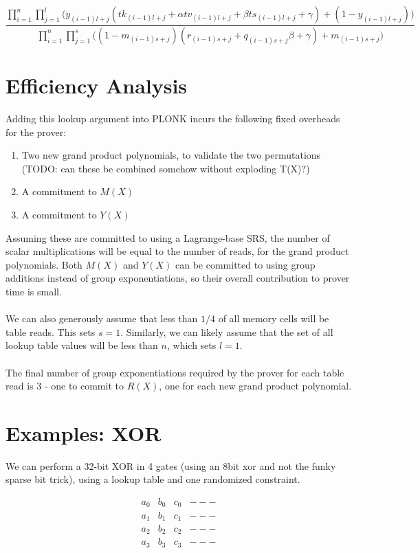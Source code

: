 \documentclass[11pt]{article} %
\begin{document}
$$
\frac{
\prod_{i=1}^n \prod_{j=1}^l \bigg( y_{(i-1)l + j}(tk_{(i-1)l + j} + \alpha tv_{(i-1)l + j} + \beta ts_{(i-1)l + j} + \gamma) + (1 - y_{(i-1)l + j}) \bigg)
}
{
{\prod_{i=1}^n \prod_{j=1}^s\bigg( (1 - m_{(i-1)s + j})(r_{(i-1)s + j} + q_{(i-1)s + j}\beta + \gamma) + m_{(i-1)s + j} \bigg)}
}
$$

\section{Efficiency Analysis}

Adding this lookup argument into PLONK incurs the following fixed overheads for the prover:

\begin{enumerate}
	\item Two new grand product polynomials, to validate the two permutations (TODO: can these be combined somehow without exploding T(X)?)
	\item A commitment to $M(X)$
	\item A commitment to $Y(X)$
\end{enumerate}

Assuming these are committed to using a Lagrange-base SRS, the number of scalar multiplications will be equal to the number of reads, for the grand product polynomials. Both $M(X)$ and $Y(X)$ can be committed to using group additions instead of group exponentiations, so their overall contribution to prover time is small.
\\
\\
We can also generously assume that less than $1/4$ of all memory cells will be table reads. This sets $s = 1$. Similarly, we can likely assume that the set of all lookup table values will be less than $n$, which sets $l = 1$.
\\
\\
The final number of group exponentiations required by the prover for each table read is $3$ - one to commit to $R(X)$, one for each new grand product polynomial.

\section{Examples: XOR}

We can perform a 32-bit XOR in 4 gates (using an 8bit xor and not the funky sparse bit trick), using a lookup table and one randomized constraint.

$$
\begin{array}{cccc}
a_0 & b_0 & c_0 & --- \\
a_1 & b_1 & c_1 & --- \\
a_2 & b_2 & c_2 & --- \\
a_3 & b_3 & c_3 & --- \\
\end{array}
$$
\end{document}
